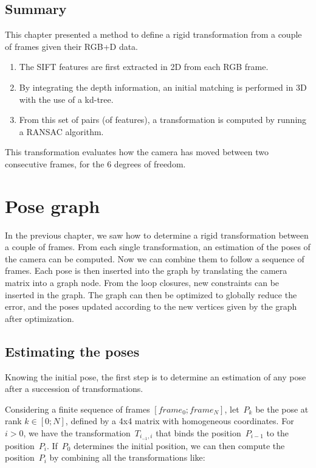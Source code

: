 \section{Summary}

This chapter presented a method to define a rigid transformation from a couple of frames given their RGB+D data.
\begin{enumerate}
\item The SIFT features are first extracted in 2D from each RGB frame.
\item By integrating the depth information, an initial matching is performed in 3D with the use of a kd-tree.
\item From this set of pairs (of features), a transformation is computed by running a RANSAC algorithm.
\end{enumerate}

This transformation evaluates how the camera has moved between two consecutive frames, for the 6 degrees of freedom.

\chapter{Pose graph}
\label{chap:graph}

In the previous chapter, we saw how to determine a rigid transformation between a couple of frames. From each single transformation, an estimation of the poses of the camera can be computed. Now we can combine them to follow a sequence of frames. Each pose is then inserted into the graph by translating the camera matrix into a graph node. From the loop closures, new constraints can be inserted in the graph. The graph can then be optimized to globally reduce the error, and the poses updated according to the new vertices given by the graph after optimization.

\section{Estimating the poses}

Knowing the initial pose, the first step is to determine an estimation of any pose after a succession of transformations.

Considering a finite sequence of frames $[frame_0 ; frame_N]$, let~$P_k$ be the pose at rank $k \in [0;N]$, defined by a 4x4 matrix with homogeneous coordinates. For~$i>0$, we have the transformation~$T_{i_{-1},i}$ that binds the position~$P_{i-1}$ to the position~$P_i$. If~$P_0$ determines the initial position, we can then compute the position~$P_i$  by combining all the transformations like:

